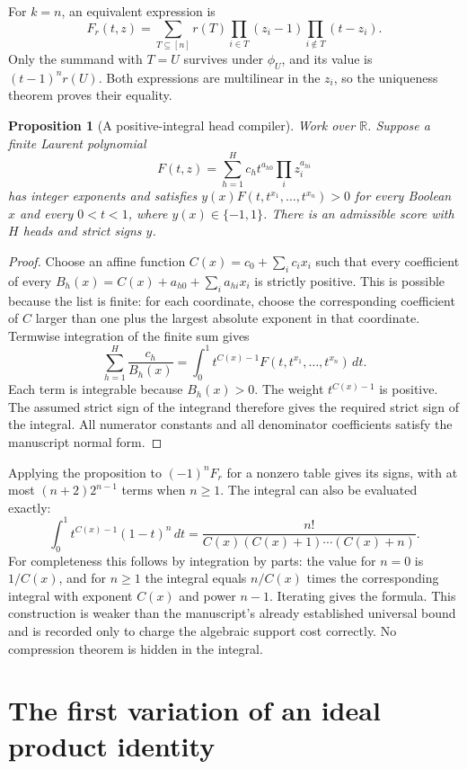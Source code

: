 \documentclass[11pt]{article}
\newtheorem{proposition}[theorem]{Proposition}
\begin{document}
For $k=n$, an equivalent expression is
\[
 F_r(t,z)=\sum_{T\subseteq[n]}r(T)
        \prod_{i\in T}(z_i-1)\prod_{i\notin T}(t-z_i).
\]
Only the summand with $T=U$ survives under $\phi_U$, and its
value is $(t-1)^nr(U)$. Both expressions are multilinear in
the $z_i$, so the uniqueness theorem proves their equality.

\begin{proposition}[A positive-integral head compiler]
Work over $\mathbb R$. Suppose a finite Laurent polynomial
\[
 F(t,z)=\sum_{h=1}^H c_h t^{a_{h0}}\prod_i z_i^{a_{hi}}
\]
has integer exponents and satisfies
$y(x)F(t,t^{x_1},\ldots,t^{x_n})>0$ for every Boolean $x$ and
every $0<t<1$, where $y(x)\in\{-1,1\}$.
There is an admissible score with $H$ heads and strict signs $y$.
\end{proposition}
\begin{proof}
Choose an affine function $C(x)=c_0+\sum_i c_ix_i$ such that
every coefficient of every
$B_h(x)=C(x)+a_{h0}+\sum_i a_{hi}x_i$ is strictly positive.
This is possible because the list is finite: for each coordinate,
choose the corresponding coefficient of $C$ larger than one plus
the largest absolute exponent in that coordinate.
Termwise integration of the finite sum gives
\[
 \sum_{h=1}^H\frac{c_h}{B_h(x)}
   =\int_0^1 t^{C(x)-1}F(t,t^{x_1},\ldots,t^{x_n})\,dt.
\]
Each term is integrable because $B_h(x)>0$. The weight
$t^{C(x)-1}$ is positive. The assumed strict sign of the integrand
therefore gives the required strict sign of the integral.
All numerator constants and all denominator coefficients satisfy
the manuscript normal form.
\end{proof}

Applying the proposition to $(-1)^nF_r$ for a nonzero table gives
its signs, with at most $(n+2)2^{n-1}$ terms when $n\geq1$.
The integral can also be evaluated exactly:
\[
 \int_0^1t^{C(x)-1}(1-t)^n\,dt
   =\frac{n!}{C(x)(C(x)+1)\cdots(C(x)+n)}.
\]
For completeness this follows by integration by parts: the value
for $n=0$ is $1/C(x)$, and for $n\geq1$ the integral equals
$n/C(x)$ times the corresponding integral with exponent $C(x)$
and power $n-1$. Iterating gives the formula. This construction
is weaker than the manuscript's already established universal
bound and is recorded only to charge the algebraic support cost
correctly. No compression theorem is hidden in the integral.

\section{The first variation of an ideal product identity}
\end{document}
